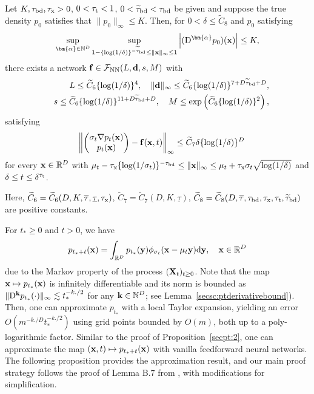 \documentclass[twoside,11pt]{article}
\def\cF{\mathcal F}
\newcommand{\bd}{{\bf d}}
\newcommand{\bff}{{\bf f}}
\newcommand{\bk}{{\bf k}}
\newcommand{\bx}{{\bf x}}
\newcommand{\bX}{{\bf X}}
\newcommand{\by}{{\bf y}}
\newcommand{\bbR}{{\mathbb R}}
\newcommand{\bbN}{{\mathbb N}}
\newcommand{\balpha}{\bm{\alpha}}
\newcommand{\bean}{\setlength\arraycolsep{1pt}\begin{eqnarray*}}
\newcommand{\eean}{\end{eqnarray*}}
\def\d{{\rm d}}
\def\D{{\rm D}}
\begin{document}
\begin{proposition}
\label{secpt:2}
Let $K, \tau_{\rm bd}, \tau_{\rm x} > 0$, $ 0 <  \tau_{\rm t} < 1 $, $0 < \widetilde \tau_{\rm bd} < \tau_{\rm bd}$ be given and suppose the true density $p_0$ satisfies that $ \| p_0 \|_{\infty} \leq K $.
Then, for $0 < \delta \leq \widetilde C_{8}$ and $p_0$ satisfying
\bean
\sup_{\balpha \in \bbN^{D}} \sup_{ 1- \{ \log (1 / \delta ) \}^{- \widetilde \tau_{\rm bd}} \leq \| \bx \|_{\infty} \leq 1 } \left\vert ( \D^{\balpha} p_0 )(\bx) \right\vert \leq K,
\eean
there exists a network $\bff \in \cF_{\rm NN} ( L, \bd, s, M )$ with
\bean
&& L \leq \widetilde C_{6} \{ \log(1/\delta)\}^{4}, \quad \| \bd\|_{\infty} \leq \widetilde C_{6} \{ \log(1/\delta)\}^{ 7 + D \widetilde \tau_{\rm bd} + D },
\\
&& s \leq \widetilde C_{6}  \{ \log(1/\delta)\}^{11+ D \widetilde \tau_{\rm bd} + D }, \quad M \leq \exp \left( \widetilde C_{6} \{\log(1/\delta) \}^{2} \right),
\eean
satisfying
\bean
&& \left\| \begin{pmatrix}
\sigma_t \nabla p_t(\bx) 
\\
 p_t(\bx)
\end{pmatrix}
-  \bff(\bx,t) \right\|_{\infty} \leq \widetilde C_{7}  \delta \{\log(1/\delta) \}^{D}
\eean
for every $\bx \in \bbR^{D}$ with $\mu_{t} -  \tau_{\rm x} \{ \log (1/\sigma_{t}) \}^{-\tau_{\rm bd}}  \leq \|\bx \|_{\infty} \leq \mu_{t} + \tau_{\rm x} \sigma_{t} \sqrt{\log (1/\delta)}$ and $\delta \leq t \leq \delta^{\tau_{\rm t}}$.

Here, $\widetilde C_{6} = \widetilde C_{6}( D, K, \overline{\tau}, \underline{\tau}, \tau_{\rm x} )$, $\widetilde C_{7} = \widetilde C_{7} ( D , K , \underline{\tau} )$,  $ \widetilde C_{8} = \widetilde C_{8}( D,  \overline{\tau}, \tau_{\rm bd}, \tau_{\rm x}, \tau_{\rm t}, \widetilde \tau_{\rm bd} )$ are positive constants.

\end{proposition}



For $t_{*} \geq 0$ and $t > 0$,  we have
\bean
p_{t_* + t}(\bx) = \int_{\bbR^{D}} p_{t_*}(\by) \phi_{\sigma_{t}}(\bx-\mu_{t} \by) \d \by, \quad \bx \in \bbR^{D}
\eean
due to the Markov property of the process $(\bX_{t})_{t \geq 0}$. 
Note that the map $\bx \mapsto p_{t_*}(\bx)$ is infinitely differentiable and its norm is bounded as  $\| \D^{\bk} p_{t_*} (\cdot) \|_{\infty} \lesssim t_{*}^{-k./2}$ for any $\bk \in \bbN^{D}$; see Lemma~\ref{secsc:ptderivativebound}).
Then, one can approximate $p_{t_*}$ with a local Taylor expansion, yielding an error $O ( m^{-k. / D}  t_{*}^{-k./2} )$ using grid points bounded by $ O ( m )$, both up to a poly-logarithmic factor.
Similar to the proof of Proposition~\ref{secpt:2}, one can approximate the map $ (\bx,t) \mapsto p_{t_*+t}(\bx) $ with vanilla feedforward neural networks.
The following proposition provides the approximation result, and our main proof strategy follows the proof of Lemma B.7 from \citet{oko2023diffusion}, with modifications for simplification.
\end{document}

